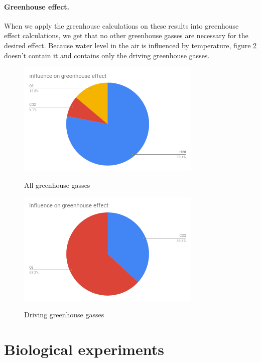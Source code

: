 \documentclass{cfp}
\begin{document}
\paragraph{Greenhouse effect.} When we apply the greenhouse calculations on these results into greenhouse effect calculations, we get that no other greenhouse gasses are necessary for the desired effect. Because water level in the air is influenced by temperature, figure \ref{gr2} doesn't contain it and contains only the driving greenhouse gasses.
\begin{figure}[!h]
\centering
\caption{All greenhouse gasses}
\includegraphics[width=250pt]{gr1.png}
\label{gr1}
\end{figure}
\begin{figure}[!h]
\centering
\caption{Driving greenhouse gasses}
\includegraphics[width=250pt]{gr2.png}
\label{gr2}
\end{figure}
\section{Biological experiments}
\end{document}
